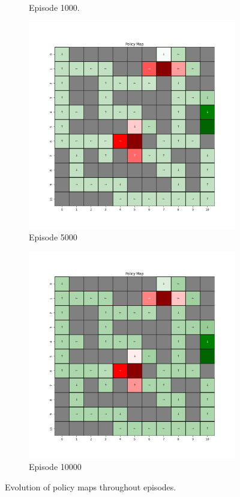 \documentclass{assignment}
\begin{document}
\begin{figure}[H]
\begin{subfigure}{0.3\textwidth}
    \caption{Episode 1000.}
    \end{subfigure}\hfill
    \begin{subfigure}{0.3\textwidth}
        \includegraphics[width=\textwidth]{figures/policy_td/gamma_sweep/policy_alpha_0.1_gamma_0.25_epsilon_0.2_iteration_5000.png}
    \caption{Episode 5000}
    \end{subfigure}\hfill
    \begin{subfigure}{0.3\textwidth}
        \includegraphics[width=\textwidth]{figures/policy_td/gamma_sweep/policy_alpha_0.1_gamma_0.25_epsilon_0.2_iteration_10000.png}
    \caption{Episode 10000}
    \end{subfigure}
    \caption{Evolution of policy maps throughout episodes.}
    \label{fig:gamma_0.25_td_learning_policy}
\end{figure}
\end{document}
